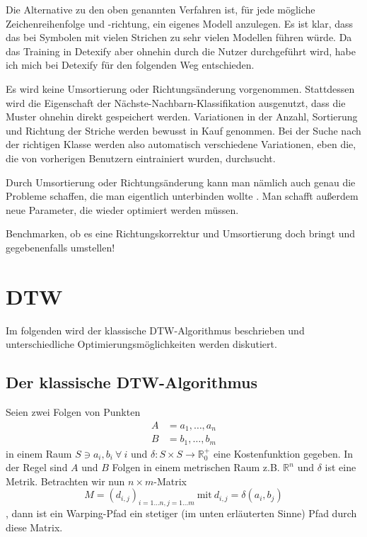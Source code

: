 Die Alternative zu den oben genannten Verfahren ist, für jede mögliche Zeichenreihenfolge und -richtung, ein eigenes Modell anzulegen. Es ist klar, dass das bei Symbolen mit vielen Strichen zu sehr vielen Modellen führen würde. Da das Training in Detexify aber ohnehin durch die Nutzer durchgeführt wird, habe ich mich bei Detexify für den folgenden Weg entschieden.

Es wird keine Umsortierung oder Richtungsänderung vorgenommen. Stattdessen wird die Eigenschaft der Nächste-Nachbarn-Klassifikation ausgenutzt, dass die Muster ohnehin direkt gespeichert werden. Variationen in der Anzahl, Sortierung und Richtung der Striche werden bewusst in Kauf genommen. Bei der Suche nach der richtigen Klasse werden also automatisch verschiedene Variationen, eben die, die von vorherigen Benutzern eintrainiert wurden, durchsucht.

Durch Umsortierung oder Richtungsänderung kann man nämlich auch genau die Probleme schaffen, die man eigentlich unterbinden wollte \cite{Matasakis:1999p9465}. Man schafft außerdem neue Parameter, die wieder optimiert werden müssen.

\TODO Benchmarken, ob es eine Richtungskorrektur und Umsortierung doch bringt und gegebenenfalls umstellen!

\section{DTW} %
\label{sec:dtw}

Im folgenden wird der klassische DTW-Algorithmus beschrieben und unterschiedliche Optimierungsmöglichkeiten werden diskutiert.

\subsection{Der klassische DTW-Algorithmus} %
\label{sub:dtw}

Seien zwei Folgen von Punkten
\begin{align}
  \label{eqn:a}
  A &= a_1, \dots, a_n \\
  \label{eqn:b}
  B &= b_1, \dots, b_m
\end{align}
in einem Raum \( S \ni a_i, b_i ~\forall~i \) und %
\( \delta : S\times S \rightarrow \mathbb{R}_0^+ \) eine Kostenfunktion
gegeben. In der Regel sind \(A\) und \(B\) Folgen in einem metrischen Raum z.B. \(\mathbb{R}^n\) und \(\delta\) ist eine Metrik.
Betrachten wir nun \( n\times m\)-Matrix 
\begin{equation} \label{eqn:matrix}
  M = (d_{i,j})_{i=1\dots n, j=1\dots m} ~\text{mit}~ d_{i,j} = \delta(a_i,b_j)
\end{equation}
, dann ist ein Warping-Pfad ein stetiger (im unten erläuterten Sinne) Pfad durch diese Matrix. 

